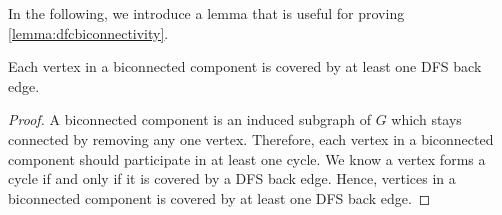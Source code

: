 In the following, we introduce a lemma that is useful for proving \cref{lemma:dfcbiconnectivity}.

\begin{lemma}
\label{lemma:binnect_back_edge_cover}
Each vertex in a biconnected component is covered by at least one DFS back edge.
\end{lemma}
\begin{proof}
A biconnected component is an induced subgraph of $G$ which stays connected by removing any one vertex. Therefore, each vertex in a biconnected component should participate in at least one cycle.
We know a vertex forms a cycle if and only if it is covered by a DFS back edge. Hence, vertices in a biconnected component is covered by at least one DFS back edge.
\end{proof}

